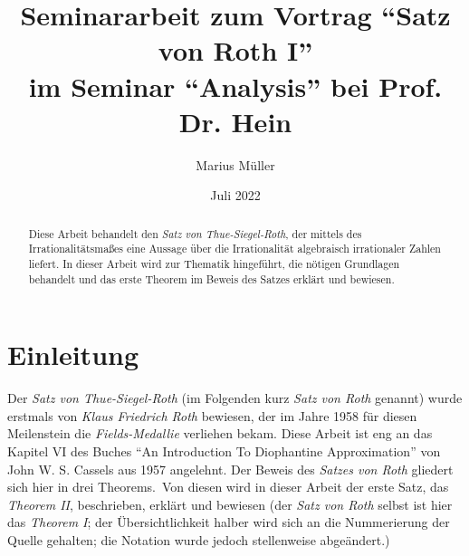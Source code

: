 \documentclass[11pt]{article}
\title{Seminararbeit zum Vortrag ``Satz von Roth I'' \\ im Seminar ``Analysis'' bei Prof. Dr. Hein}
\author{Marius Müller}
\date{Juli 2022}
\begin{document}
    \maketitle

    \vfill

    \begin{abstract}
        \noindent \textrm{Diese Arbeit behandelt den \emph{Satz von Thue-Siegel-Roth}, der mittels des Irrationalitätsmaßes
        eine Aussage über die Irrationalität algebraisch irrationaler Zahlen liefert.
        \newline
        In dieser Arbeit wird zur Thematik hingeführt, die nötigen Grundlagen behandelt und das erste Theorem im Beweis
        des Satzes erklärt und bewiesen.}
    \end{abstract}

    \newpage

    \tableofcontents

    \newpage

    \section{Einleitung}
    \label{sec:intro}
        \textrm{Der \emph{Satz von Thue-Siegel-Roth} (im Folgenden kurz \emph{Satz von Roth} genannt) wurde erstmals von
        \emph{Klaus Friedrich Roth} bewiesen, der im Jahre 1958 für diesen Meilenstein die \emph{Fields-Medallie}
        verliehen bekam.
        \newline
        Diese Arbeit ist eng an das Kapitel VI des Buches ``An Introduction To Diophantine Approximation'' von
        John W. S. Cassels aus 1957 angelehnt.
        \newline
        Der Beweis des \emph{Satzes von Roth} gliedert sich hier in drei Theorems.\ Von diesen wird in dieser
        Arbeit der erste Satz, das \emph{Theorem II}, beschrieben, erklärt und bewiesen (der \emph{Satz von Roth} selbst
        ist hier das \emph{Theorem I}; der Übersichtlichkeit halber wird sich an die Nummerierung der Quelle gehalten;
        die Notation wurde jedoch stellenweise abgeändert.)}

    
    
    

    
        
\end{document}
